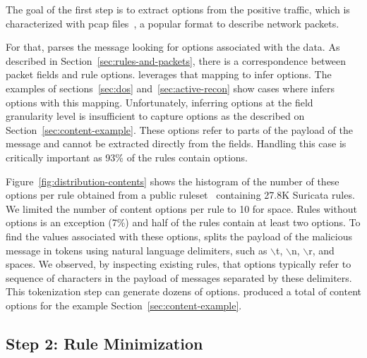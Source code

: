 \documentclass[sigconf,review, anonymous]{acmart}
\begin{document}
The goal of the first step is to extract options from the positive
traffic, which is characterized with pcap files~\cite{pcap}, a popular
format to describe network packets.

For that, \tname{} parses the message looking for options associated
with the data. As described in Section~\ref{sec:rules-and-packets},
there is a correspondence between packet fields and rule
options. \tname{} leverages that mapping to infer options. The
examples of sections~\ref{sec:dos} and~\ref{sec:active-recon} show
cases where \tname{} infers options with this mapping. Unfortunately,
inferring options at the field granularity level is insufficient to
capture  options as the described on
Section~\ref{sec:content-example}. These options refer to parts of the
payload of the message and cannot be extracted directly from the
fields. Handling this case is critically important as 93\% of
the rules contain  options.


Figure~\ref{fig:distribution-contents} shows the histogram of the
number of these options per rule obtained from a public
ruleset~\cite{emerging-threats-open} containing 27.8K Suricata
rules. We limited the number of content options per rule to 10 for
space. Rules without  options is an exception
(7\%) and half of the rules contain at least two
 options.  To find the values associated with these
options, \tname{} splits the payload of the malicious message in
tokens using natural language delimiters, such as $\backslash$t,
$\backslash$n, $\backslash$r, and spaces. We observed, by inspecting
existing rules, that  options typically refer to
sequence of characters in the payload of messages separated by these
delimiters. This tokenization step can generate dozens of options.
\tname{} produced a total of  content options for the example
Section~\ref{sec:content-example}.




\subsection{Step 2: Rule Minimization}
\label{sec:minimization}
\end{document}

